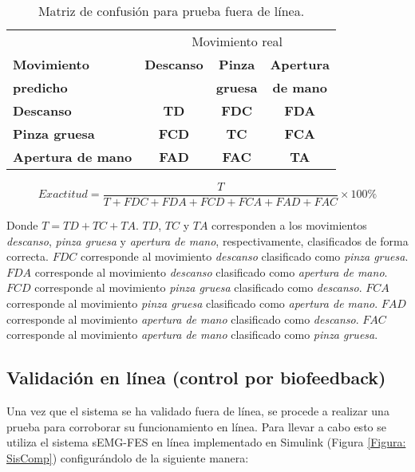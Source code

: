 \begin{table}[htbp]
	\centering
	\begin{tabular}{|l|c|c|c|}
	\hline
	\textbf{} & \multicolumn{3}{|c|}{Movimiento real}\\
	\textbf{Movimiento} & \textbf{Descanso} & \textbf{Pinza} & \textbf{Apertura}\\
	\textbf{predicho} & \textbf{} & \textbf{gruesa} & \textbf{de mano}\\ \hline \hline
	\textbf{Descanso} & \textbf{TD} & \textbf{FDC} & \textbf{FDA}\\ \hline
	\textbf{Pinza gruesa} & \textbf{FCD} & \textbf{TC} & \textbf{FCA}\\ \hline
	\textbf{Apertura de mano} & \textbf{FAD} & \textbf{FAC} & \textbf{TA}\\ \hline
	\end{tabular}
	\caption{Matriz de confusión para prueba fuera de línea.}
	\label{Cuadro:PorcentajesObtencion}
\end{table}

\begin{equation}
	Exactitud = \frac{T}{T+FDC+FDA+FCD+FCA+FAD+FAC}\times100\%
	\label{Ecu: Exactitud}
\end{equation}

Donde $T = TD+TC+TA$. $TD$, $TC$ y $TA$ corresponden a los movimientos \emph{descanso}, \emph{pinza gruesa} y \emph{apertura de mano}, respectivamente, clasificados de forma correcta. $FDC$ corresponde al movimiento \emph{descanso} clasificado como \emph{pinza gruesa}. $FDA$ corresponde al movimiento \emph{descanso} clasificado como \emph{apertura de mano}. $FCD$ corresponde al movimiento \emph{pinza gruesa} clasificado como \emph{descanso}. $FCA$ corresponde al movimiento \emph{pinza gruesa} clasificado como \emph{apertura de mano}. $FAD$ corresponde al movimiento \emph{apertura de mano} clasificado como \emph{descanso}. $FAC$ corresponde al movimiento \emph{apertura de mano} clasificado como \emph{pinza gruesa}.

\subsection{Validación en línea (control por biofeedback)}
Una vez que el sistema se ha validado fuera de línea, se procede a realizar una prueba para corroborar su funcionamiento en línea. Para llevar a cabo esto se utiliza el sistema sEMG-FES en línea implementado en Simulink\textregistered \; (Figura \ref{Figura: SisComp}) configurándolo de la siguiente manera:

